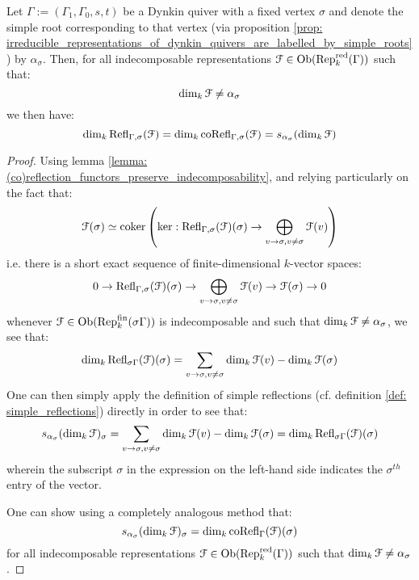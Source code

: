             \begin{proposition} \label{prop: (co)reflection_functors_as_simple_reflections}
                Let $\Gamma := (\Gamma_1, \Gamma_0, s, t)$ be a Dynkin quiver with a fixed vertex $\sigma$ and denote the simple root corresponding to that vertex (via proposition \ref{prop: irreducible_representations_of_dynkin_quivers_are_labelled_by_simple_roots}) by $\alpha_{\sigma}$. Then, for all indecomposable representations $\mathcal{F} \in \mathrm{Ob}(\mathrm{Rep}_k^{\mathrm{red}}(\Gamma))$ such that:
                    $$\dim_k \mathcal{F} \not = \alpha_{\sigma}$$
                we then have:
                    $$\dim_k \mathrm{Refl}_{\Gamma, \sigma}(\mathcal{F}) = \dim_k \mathrm{co}\mathrm{Refl}_{\Gamma, \sigma}(\mathcal{F}) = s_{\alpha_{\sigma}}(\dim_k \mathcal{F})$$
            \end{proposition}
                \begin{proof}
                    Using lemma \ref{lemma: (co)reflection_functors_preserve_indecomposability}, and relying particularly on the fact that:
                        $$\mathcal{F}(\sigma) \simeq \operatorname{coker}\left(\ker: \mathrm{Refl}_{\Gamma, \sigma}(\mathcal{F})(\sigma) \to \bigoplus_{v \to \sigma, v \not = \sigma} \mathcal{F}(v)\right)$$
                    i.e. there is a short exact sequence of finite-dimensional $k$-vector spaces:
                        $$0 \to \mathrm{Refl}_{\Gamma, \sigma}(\mathcal{F})(\sigma) \to \bigoplus_{v \to \sigma, v \not = \sigma} \mathcal{F}(v) \to \mathcal{F}(\sigma) \to 0$$
                    whenever $\mathcal{F} \in \mathrm{Ob}(\mathrm{Rep}_k^{\mathrm{fin}}(\sigma\Gamma))$ is indecomposable and such that $\dim_k \mathcal{F} \not = \alpha_{\sigma}$, we see that:
                        $$\dim_k \mathrm{Refl}_{\sigma\Gamma}(\mathcal{F})(\sigma) = \sum_{v \to \sigma, v \not = \sigma} \dim_k \mathcal{F}(v) - \dim_k \mathcal{F}(\sigma)$$
                    One can then simply apply the definition of simple reflections (cf. definition \ref{def: simple_reflections}) directly in order to see that:
                        $$s_{\alpha_{\sigma}}(\dim_k \mathcal{F})_{\sigma} = \sum_{v \to \sigma, v \not = \sigma} \dim_k \mathcal{F}(v) - \dim_k \mathcal{F}(\sigma) = \dim_k \mathrm{Refl}_{\sigma\Gamma}(\mathcal{F})(\sigma)$$
                    wherein the subscript $\sigma$ in the expression on the left-hand side indicates the $\sigma^{th}$ entry of the vector. 
                    
                    One can show using a completely analogous method that:
                        $$s_{\alpha_{\sigma}}(\dim_k \mathcal{F})_{\sigma} = \dim_k \mathrm{co}\mathrm{Refl}_{\Gamma}(\mathcal{F})(\sigma)$$
                    for all indecomposable representations $\mathcal{F} \in \mathrm{Ob}(\mathrm{Rep}_k^{\mathrm{red}}(\Gamma))$ such that $\dim_k \mathcal{F} \not = \alpha_{\sigma}$.
                \end{proof}
                
